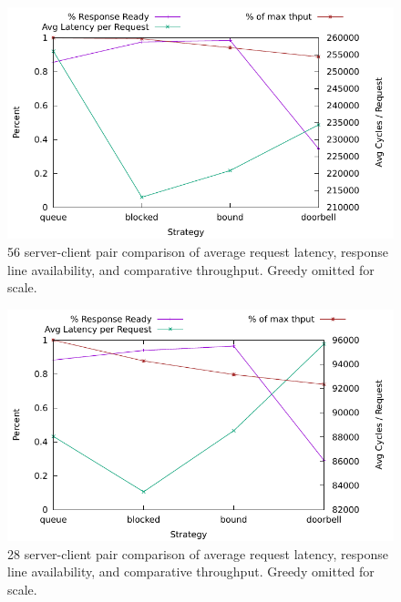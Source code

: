 \documentclass{uicthesi}
\begin{document}
\begin{figure}[ht!]
\centering
\includegraphics[width=0.9\columnwidth]{FIG/flat_latency_56.pdf}
\caption{56 server-client pair comparison of average request latency, response line availability, and comparative throughput. Greedy omitted for scale.}
\label{fig:flat_latency_56}
\end{figure}

\begin{figure}[ht!]
\centering
\includegraphics[width=0.9\columnwidth]{FIG/flat_latency_28.pdf}
\caption{28 server-client pair comparison of average request latency, response line availability, and comparative throughput. Greedy omitted for scale.}
\label{fig:flat_latency_28}
\end{figure}
\end{document}
